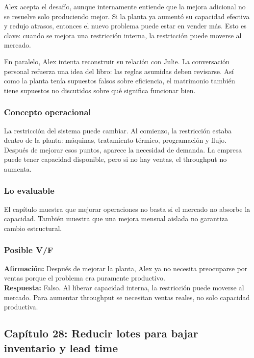 \documentclass[
  11pt,
]{article}
\begin{document}
Alex acepta el desafío, aunque internamente entiende que la mejora
adicional no se resuelve solo produciendo mejor. Si la planta ya aumentó
su capacidad efectiva y redujo atrasos, entonces el nuevo problema puede
estar en vender más. Esto es clave: cuando se mejora una restricción
interna, la restricción puede moverse al mercado.

En paralelo, Alex intenta reconstruir su relación con Julie. La
conversación personal refuerza una idea del libro: las reglas asumidas
deben revisarse. Así como la planta tenía supuestos falsos sobre
eficiencia, el matrimonio también tiene supuestos no discutidos sobre
qué significa funcionar bien.

\hypertarget{concepto-operacional}{%
\subsubsection{Concepto operacional}\label{concepto-operacional}}

La restricción del sistema puede cambiar. Al comienzo, la restricción
estaba dentro de la planta: máquinas, tratamiento térmico, programación
y flujo. Después de mejorar esos puntos, aparece la necesidad de
demanda. La empresa puede tener capacidad disponible, pero si no hay
ventas, el throughput no aumenta.

\hypertarget{lo-evaluable}{%
\subsubsection{Lo evaluable}\label{lo-evaluable}}

El capítulo muestra que mejorar operaciones no basta si el mercado no
absorbe la capacidad. También muestra que una mejora mensual aislada no
garantiza cambio estructural.

\hypertarget{posible-vf}{%
\subsubsection{Posible V/F}\label{posible-vf}}

\textbf{Afirmación:} Después de mejorar la planta, Alex ya no necesita
preocuparse por ventas porque el problema era puramente productivo.\\
\textbf{Respuesta:} Falso. Al liberar capacidad interna, la restricción
puede moverse al mercado. Para aumentar throughput se necesitan ventas
reales, no solo capacidad productiva.

\hypertarget{capuxedtulo-28-reducir-lotes-para-bajar-inventario-y-lead-time}{%
\subsection{Capítulo 28: Reducir lotes para bajar inventario y lead
time}\label{capuxedtulo-28-reducir-lotes-para-bajar-inventario-y-lead-time}}
\end{document}
